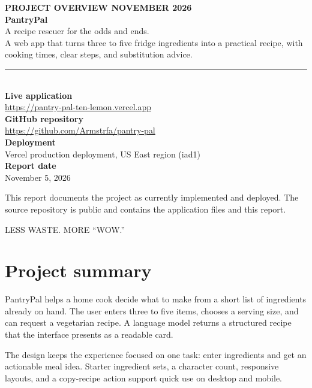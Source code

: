 \documentclass[11pt]{article}
\begin{document}
\begin{titlepage}
\thispagestyle{empty}
\vspace*{0.7in}
{\large\bfseries\color{orange}PROJECT OVERVIEW \hfill NOVEMBER 2026}\\[1.4in]
{\fontsize{36}{42}\selectfont\bfseries\color{forest}PantryPal}\\[0.15in]
{\LARGE\color{orange}A recipe rescuer for the odds and ends.}\\[0.35in]
{\large A web app that turns three to five fridge ingredients into a practical recipe, with cooking times, clear steps, and substitution advice.}\\[0.75in]
\color{forest}\rule{\linewidth}{1.2pt}\\[0.22in]
\textbf{Live application}\\
\href{https://pantry-pal-ten-lemon.vercel.app}{https://pantry-pal-ten-lemon.vercel.app}\\[0.18in]
\textbf{GitHub repository}\\
\href{https://github.com/Armstrfa/pantry-pal}{https://github.com/Armstrfa/pantry-pal}\\[0.18in]
\textbf{Deployment}\\
Vercel production deployment, US East region (iad1)\\[0.18in]
\textbf{Report date}\\
November 5, 2026\\[0.45in]
\begin{minipage}{0.85\linewidth}
\small\color{muted}
This report documents the project as currently implemented and deployed. The source repository is public and contains the application files and this report.
\end{minipage}
\vfill
{\small\color{muted}LESS WASTE. MORE ``WOW.''}
\end{titlepage}

\section{Project summary}
PantryPal helps a home cook decide what to make from a short list of ingredients already on hand. The user enters three to five items, chooses a serving size, and can request a vegetarian recipe. A language model returns a structured recipe that the interface presents as a readable card.

The design keeps the experience focused on one task: enter ingredients and get an actionable meal idea. Starter ingredient sets, a character count, responsive layouts, and a copy-recipe action support quick use on desktop and mobile.
\end{document}
